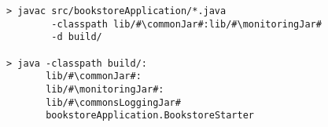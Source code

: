 \begin{lstlisting}[caption=Command to compile and run the instrumented Bookstore under Linux]
> javac src/bookstoreApplication/*.java
        -classpath lib/#\commonJar#:lib/#\monitoringJar#
        -d build/

> java -classpath build/:
       lib/#\commonJar#:
       lib/#\monitoringJar#:
       lib/#\commonsLoggingJar#
       bookstoreApplication.BookstoreStarter 
\end{lstlisting}
